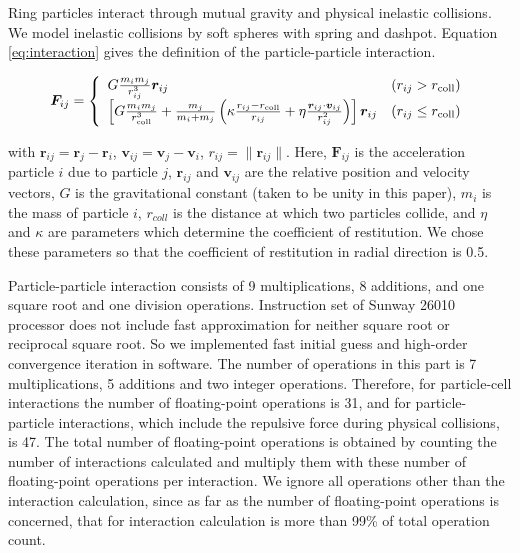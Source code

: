 \documentclass[oribibl]{llncs}
\begin{document}
Ring particles interact through mutual gravity and physical inelastic
collisions. We model inelastic collisions by soft spheres with spring
and dashpot. Equation \ref{eq:interaction} gives the definition of the
particle-particle interaction.

\begin{eqnarray}
  \bm F_{ij} = \left \{
  \begin{array}{ll}
     G \frac{m_i m_j}{r_{ij}^3} \bm r_{ij} & \left(r_{ij} > r_{\rm coll} \right) \\
     \left[  G \frac{m_i m_j} {r_{\rm coll}^3} + \frac{m_j}{m_i + m_j} \left( \kappa \frac{ r_{ij} - r_{\rm coll}}{r_{ij}} + \eta \frac{\bm r_{ij} \cdot \bm v_{ij}}{r_{ij}^2} \right) \right] \bm r_{ij} & \left( r_{ij} \le r_{\rm coll} \right)
  \end{array}
  \right.
  \label{eq:interaction} 
\end{eqnarray}

with $\bm r_{ij} = \bm r_j - \bm r_i$, $\bm v_{ij} = \bm v_j - \bm
v_i$, $r_{ij} = \| \bm r_{ij} \|$. Here, ${\mathbf F_{ij}}$ is the
acceleration particle $i$ due to particle $j$, ${\mathbf r_{ij}}$ and
${\mathbf v_{ij}}$ are the relative position and velocity vectors, $G$
is the gravitational constant (taken to be unity in this paper), $m_i$
is the mass of particle $i$, $r_{coll}$ is the distance at which two
particles collide, and $\eta$ and $\kappa$ are parameters which
determine the coefficient of restitution. We chose these parameters so
that the coefficient of restitution in radial direction is 0.5.

Particle-particle interaction consists of 9 multiplications, 8
additions, and one square root and one division
operations. Instruction set of Sunway 26010 processor does not include
fast approximation for neither square root or reciprocal square
root. So we implemented fast initial guess and high-order convergence
iteration in software. The number of operations in this part is 7
multiplications, 5 additions and two integer operations. Therefore,
for particle-cell interactions the number of floating-point operations
is 31, and for particle-particle interactions, which include the
repulsive force during physical collisions, is 47. The total number of
floating-point operations is obtained by counting the number of
interactions calculated and multiply them with these number of
floating-point operations per interaction. We ignore all operations
other than the interaction calculation, since as far as the number of
floating-point operations is concerned, that for interaction
calculation is more than 99\% of total operation count.
\end{document}
